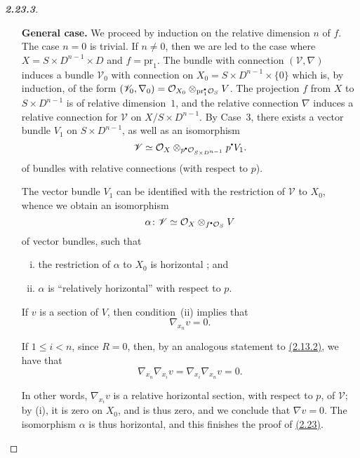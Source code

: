 \documentclass{report}
\newcommand{\scr}[1]{{\mathscr{#1}}}
\renewcommand{\cal}[1]{{\mathcal{#1}}}
\newcommand{\sbullet}{{\mathbin{\vcenter{\hbox{\scalebox{.5}{$\bullet$}}}}}}
\newcommand{\pr}{\mathrm{pr}}
\renewcommand{\leq}{\leqslant}
\newcommand{\oldpage}[1]{\marginpar{\footnotesize$\Big\vert$ \textit{p.~#1}}}
\begin{document}
\begin{proof}[\normalfont\textbf{2.23.3}]
\begin{enumerate}[\bf {Case}~1:]
      We can suppose that $S$ is a closed analytic subset of $D^n$, and that $X=S\times D$ and $f=\pr_1$.
      The relative local systems (resp. the modules with relative connections) on $X$ can then be identified with the local relative systems (resp. the modules with relative connections) on $D^n\times D$ that are annihilated by the inverse image of the ideal that defines $S$, and we conclude by using Case~2.
    \item[\bf General case.]
      We proceed by induction on the relative dimension $n$ of $f$.
      The case $n=0$ is trivial.
      If $n\neq0$, then we are led to the case where $X=S\times D^{n-1}\times D$ and $f=\pr_1$.
      The bundle with connection $(\scr{V},\nabla)$ induces a bundle $\scr{V}_0$ with connection on $X_0=S\times D^{n-1}\times\{0\}$ which is, by induction, of the form $(\scr{V}_0,\nabla_0) = \cal{O}_{X_0}\otimes_{\pr_1^\sbullet\cal{O}_S}V$.
      The projection $f$ from $X$ to $S\times D^{n-1}$ is of relative dimension~$1$, and the relative connection $\nabla$ induces a relative connection for $\scr{V}$ on $X/S\times D^{n-1}$.
      By Case~3, there exists a vector bundle $V_1$ on $S\times D^{n-1}$, as well as an isomorphism
      \[
        \scr{V} \simeq \cal{O}_X\otimes_{p^\sbullet\cal{O}_{S\times D^{n-1}}}p^\sbullet V_1.
      \]
      of bundles with relative connections (with respect to $p$).

      The vector bundle $V_1$ can be identified with the restriction of $\scr{V}$ to $X_0$, whence we obtain an isomorphism
      \[
        \alpha\colon \scr{V}\simeq\cal{O}_X\otimes_{f^\sbullet\cal{O}_S}V
      \]
      of vector bundles, such that
      \begin{enumerate}[(i)]
        \item the restriction of $\alpha$ to $X_0$ is horizontal ; and
        \item $\alpha$ is ``relatively horizontal'' with respect to $p$.
      \end{enumerate}

      If $v$ is a section of $V$, then condition~(ii) implies that
      \[
        \nabla_{x_n}v = 0.
      \]

      If $1\leq i<n$, since $R=0$, then, by an analogous statement to \hyperref[I.2.13.2]{(2.13.2)}, we have that
      \[
        \nabla_{x_n}\nabla_{x_i}v = \nabla_{x_i}\nabla_{x_n}v = 0.
      \]

      In other words, $\nabla_{x_i}v$ is a relative horizontal section, with respect to $p$, of $\scr{V}$;
      by (i), it is zero on $X_0$, and is thus zero, and we conclude that $\nabla v=0$.
      The isomorphism $\alpha$ is thus horizontal, and this finishes the proof
\oldpage{19}
      of \hyperref[I.2.23]{(2.23)}.
  \end{enumerate}
\end{proof}
\end{document}
